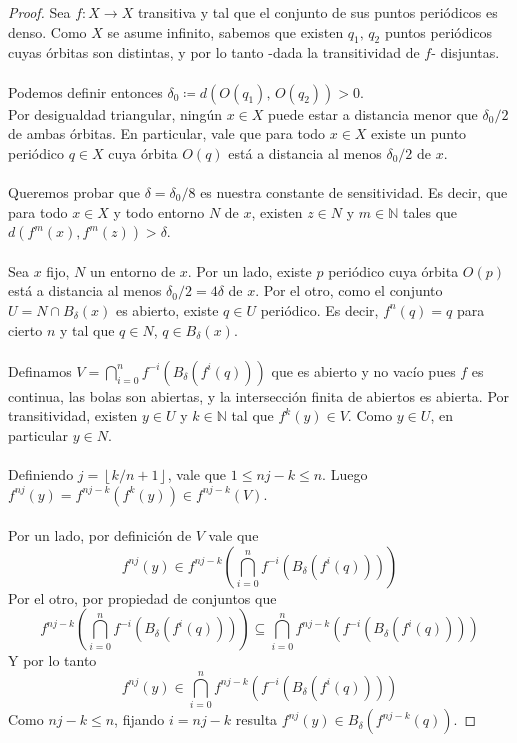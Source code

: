\documentclass[12pt,a4paper]{article}
\begin{document}
\begin{proof}
Sea $f: X \rightarrow X$ transitiva y tal que el conjunto de sus puntos periódicos es denso. Como $X$ se asume infinito, sabemos que existen $q_1, \, q_2$ puntos periódicos cuyas órbitas son distintas, y por lo tanto -dada la transitividad de $f$- disjuntas.
\\
\\
Podemos definir entonces $\delta_0 \coloneqq d(O(q_1), \, O(q_2)) > 0$.
\\
Por desigualdad triangular, ningún $x \in X$ puede estar a distancia menor que $\delta_0 / 2$ de ambas órbitas. En particular, vale que para todo $x \in X$ existe un punto periódico $q \in X$ cuya órbita $O(q)$ está a distancia al menos $\delta_0 / 2$ de $x$.
\\
\\
Queremos probar que $\delta = \delta_0/8$ es nuestra constante de sensitividad. Es decir, que para todo $x \in X$ y todo entorno $N$ de $x$, existen $z \in N$ y $m \in \mathbb{N}$ tales que $d(f^m(x), f^m(z)) > \delta$.
\\
\\
Sea $x$ fijo, $N$ un entorno de $x$. Por un lado, existe $p$ periódico cuya órbita $O(p)$ está a distancia al menos $\delta_0/2 = 4\delta$ de $x$. Por el otro, como el conjunto $U = N \cap B_\delta(x)$ es abierto, existe $q \in U$ periódico. Es decir, $f^n(q) = q$ para cierto $n$ y tal que $q \in N$, $q \in B_\delta(x)$. 
\\
\\
Definamos $V = \displaystyle \bigcap_{i=0}^n f^{-i}(B_\delta(f^i(q)))$ que es abierto y no vacío pues $f$ es continua, las bolas son abiertas, y la intersección finita de abiertos es abierta. Por transitividad, existen $y \in U$ y $k \in \mathbb{N}$ tal que $f^k(y) \in V$. Como $y \in U$, en particular $y \in N$.
\\
\\
Definiendo $j = \left\lfloor{k/n} + 1 \right\rfloor$, vale que $1 \leq nj - k \leq n$. Luego $f^{nj}(y) = f^{nj-k}(f^k(y)) \in f^{nj-k}(V)$.
\\
\\
Por un lado, por definición de $V$ vale que
\[
f^{nj}(y) \in f^{nj-k}(\bigcap_{i=0}^n f^{-i}(B_\delta(f^i(q))))
\]
Por el otro, por propiedad de conjuntos que
\[
f^{nj-k}( \bigcap_{i=0}^n f^{-i}(B_\delta(f^i(q)))) \subseteq \bigcap_{i=0}^n f^{nj-k}( f^{-i}(B_\delta(f^i(q))))
\]
Y por lo tanto
\[
f^{nj}(y) \in \bigcap_{i=0}^n f^{nj-k}(f^{-i}(B_\delta(f^i(q))))
\]
Como $nj-k \leq n$, fijando $i=nj-k$ resulta $f^{nj}(y) \in B_\delta(f^{nj-k}(q))$.

\end{proof}
\end{document}
